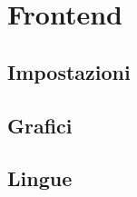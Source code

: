 \section{Frontend}
\fancyhead{}

\subsection{Impostazioni}

\subsection{Grafici}

\subsection{Lingue}